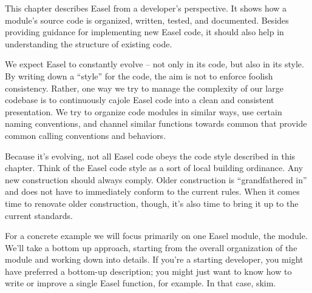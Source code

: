 
This chapter describes Easel from a developer's perspective. It shows
how a module's source code is organized, written, tested, and
documented. Besides providing guidance for implementing new Easel
code, it should also help in understanding the structure of existing
code.

We expect Easel to constantly evolve -- not only in its code, but also
in its style. By writing down a ``style'' for the code, the aim is not
to enforce foolish consistency. Rather, one way we try to manage the
complexity of our large codebase is to continuously cajole Easel code
into a clean and consistent presentation. We try to organize code
modules in similar ways, use certain naming conventions, and channel
similar functions towards common  that provide
common calling conventions and behaviors.

Because it's evolving, not all Easel code obeys the code style
described in this chapter. Think of the Easel code style as a sort of
local building ordinance. Any new construction should always
comply. Older construction is ``grandfathered in'' and does not have
to immediately conform to the current rules. When it comes time to
renovate older construction, though, it's also time to bring it up to
the current standards.

For a concrete example we will focus primarily on one Easel module,
the  module. We'll take a bottom up approach, starting
from the overall organization of the module and working down into
details. If you're a starting developer, you might have preferred a
bottom-up description; you might just want to know how to write or
improve a single Easel function, for example. In that case, skim.

